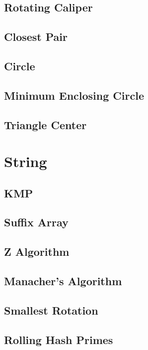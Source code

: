 \documentclass[a4paper,10pt,twocolumn,oneside]{article}
\begin{document}
\subsection{Rotating Caliper}

\subsection{Closest Pair}

\subsection{Circle}

\subsection{Minimum Enclosing Circle}

\subsection{Triangle Center}

\section{String}
\subsection{KMP}

\subsection{Suffix Array}

\subsection{Z Algorithm}

\subsection{Manacher's Algorithm}

\subsection{Smallest Rotation}

\subsection{Rolling Hash Primes}

\end{document}
